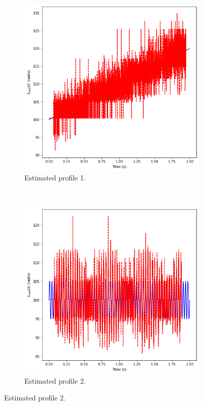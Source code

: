 \documentclass{article}
\begin{document}
	\begin{figure}[htb!]
		\centering
		\begin{subfigure}[b]{0.45\textwidth}
			\centering
			\includegraphics[width=\textwidth]{Q4_f1_2.png}
			\caption{Estimated profile 1.}
		\end{subfigure}
		~
		\begin{subfigure}[b]{0.45\textwidth}
			\centering
			\includegraphics[width=\textwidth]{Q4_f2_2.png}
			\caption{Estimated profile 2.}
		\end{subfigure}
		

\end{figure}
\end{document}
